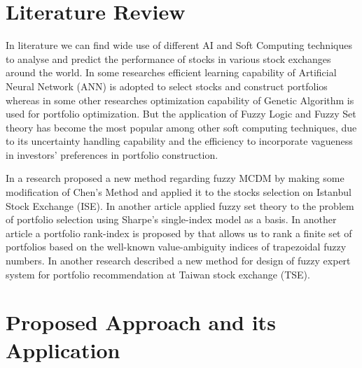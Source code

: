 \documentclass{ws-ijufks}
\begin{document}
\section{Literature Review}
In literature we can find wide use of different AI and Soft Computing techniques to 
analyse and predict the performance of stocks in various stock exchanges around the 
world. In some researches 
\cite{Adebiyi2012ANN,Fernandez2007ANN,Ko2008ANN,Olatunji2011ANN,De2011ANN} efficient 
learning capability of Artificial Neural Network (ANN) is adopted to select stocks and 
construct portfolios whereas in some other researches 
\cite{Chen2009GAa,Chang2009GA,Chen2009GAb,Jiao2007GA,Chen2010GA} optimization capability 
of Genetic Algorithm is used for portfolio optimization. But the application of Fuzzy 
Logic and Fuzzy Set theory has become the most popular among other soft computing 
techniques, due to its uncertainty handling capability and the efficiency to 
incorporate vagueness in investors' preferences in portfolio construction. 

In a research \cite{Tiryaki2005fuzzy} proposed a new method regarding fuzzy MCDM 
by making some modification of Chen's Method \cite{chen2001fuzzy} and applied it to the 
stocks selection on Istanbul Stock Exchange (ISE). In another article 
\cite{Bilbao2006fuzzy} applied fuzzy set theory to the problem of portfolio selection 
using Sharpe’s single-index model as a basis. In another article a portfolio rank-index 
is proposed by \cite{Bermudez2007fuzzy} that allows us to rank a finite set of 
portfolios based on the well-known value-ambiguity indices of trapezoidal fuzzy numbers. 
In another research \cite{Fasanghari2010design} described a new method for design of 
fuzzy expert system for portfolio recommendation at Taiwan stock exchange (TSE).

\section{Proposed Approach and its Application}
\end{document}
